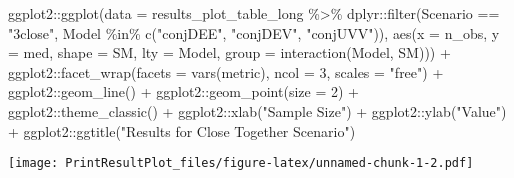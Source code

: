 \documentclass[
]{article}
\newenvironment{Shaded}{\begin{snugshade}}{\end{snugshade}}
\newcommand{\AttributeTok}[1]{\textcolor[rgb]{0.77,0.63,0.00}{#1}}
\newcommand{\DecValTok}[1]{\textcolor[rgb]{0.00,0.00,0.81}{#1}}
\newcommand{\FunctionTok}[1]{\textcolor[rgb]{0.00,0.00,0.00}{#1}}
\newcommand{\NormalTok}[1]{#1}
\newcommand{\SpecialCharTok}[1]{\textcolor[rgb]{0.00,0.00,0.00}{#1}}
\newcommand{\StringTok}[1]{\textcolor[rgb]{0.31,0.60,0.02}{#1}}
\begin{document}
\begin{Shaded}
\begin{Highlighting}[]
\NormalTok{ggplot2}\SpecialCharTok{::}\FunctionTok{ggplot}\NormalTok{(}\AttributeTok{data =}\NormalTok{ results\_plot\_table\_long }\SpecialCharTok{\%\textgreater{}\%} 
\NormalTok{                  dplyr}\SpecialCharTok{::}\FunctionTok{filter}\NormalTok{(Scenario }\SpecialCharTok{==} \StringTok{"3close"}\NormalTok{, Model }\SpecialCharTok{\%in\%} \FunctionTok{c}\NormalTok{(}\StringTok{"conjDEE"}\NormalTok{, }\StringTok{"conjDEV"}\NormalTok{, }\StringTok{"conjUVV"}\NormalTok{)), }
                \FunctionTok{aes}\NormalTok{(}\AttributeTok{x =}\NormalTok{ n\_obs, }\AttributeTok{y =}\NormalTok{ med, }\AttributeTok{shape =}\NormalTok{ SM, }\AttributeTok{lty =}\NormalTok{ Model, }
                    \AttributeTok{group =} \FunctionTok{interaction}\NormalTok{(Model, SM))) }\SpecialCharTok{+}
\NormalTok{  ggplot2}\SpecialCharTok{::}\FunctionTok{facet\_wrap}\NormalTok{(}\AttributeTok{facets =} \FunctionTok{vars}\NormalTok{(metric), }\AttributeTok{ncol =} \DecValTok{3}\NormalTok{, }\AttributeTok{scales =} \StringTok{"free"}\NormalTok{) }\SpecialCharTok{+}
\NormalTok{  ggplot2}\SpecialCharTok{::}\FunctionTok{geom\_line}\NormalTok{() }\SpecialCharTok{+} 
\NormalTok{  ggplot2}\SpecialCharTok{::}\FunctionTok{geom\_point}\NormalTok{(}\AttributeTok{size =} \DecValTok{2}\NormalTok{) }\SpecialCharTok{+}
\NormalTok{  ggplot2}\SpecialCharTok{::}\FunctionTok{theme\_classic}\NormalTok{() }\SpecialCharTok{+}
\NormalTok{  ggplot2}\SpecialCharTok{::}\FunctionTok{xlab}\NormalTok{(}\StringTok{"Sample Size"}\NormalTok{) }\SpecialCharTok{+}
\NormalTok{  ggplot2}\SpecialCharTok{::}\FunctionTok{ylab}\NormalTok{(}\StringTok{"Value"}\NormalTok{) }\SpecialCharTok{+}
\NormalTok{  ggplot2}\SpecialCharTok{::}\FunctionTok{ggtitle}\NormalTok{(}\StringTok{"Results for Close Together Scenario"}\NormalTok{)}
\end{Highlighting}
\end{Shaded}

\texttt{[image: PrintResultPlot\_files/figure-latex/unnamed-chunk-1-2.pdf]}
\end{document}
